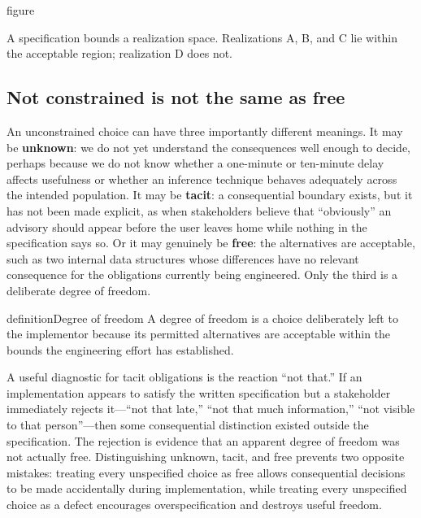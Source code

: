 \begin{bookbox}{figure}{} %
\pandocbounded{}

A specification bounds a realization space. Realizations A, B, and C lie within the acceptable
region; realization D does not.
\end{bookbox}

\subsection{Not constrained is not the same as free}\label{sec-unknown-tacit-free}

An unconstrained choice can have three importantly different meanings. It may be \textbf{unknown}: we do
not yet understand the consequences well enough to decide, perhaps because we do not know whether a
one-minute or ten-minute delay affects usefulness or whether an inference technique behaves
adequately across the intended population. It may be \textbf{tacit}: a consequential boundary exists,
but it has not been made explicit, as when stakeholders believe that ``obviously'' an advisory should
appear before the user leaves home while nothing in the specification says so. Or it may genuinely
be \textbf{free}: the alternatives are acceptable, such as two internal data structures whose
differences have no relevant consequence for the obligations currently being engineered. Only the
third is a deliberate degree of freedom.

\begin{bookbox}{definition}{Degree of freedom} %
A degree of freedom is a choice deliberately left to the implementor because its permitted
alternatives are acceptable within the bounds the engineering effort has established.
\end{bookbox}

A useful diagnostic for tacit obligations is the reaction ``not that.'' If an implementation appears
to satisfy the written specification but a stakeholder immediately rejects it---``not that late,'' ``not
that much information,'' ``not visible to that person''---then some consequential distinction existed
outside the specification. The rejection is evidence that an apparent degree of freedom was not
actually free. Distinguishing unknown, tacit, and free prevents two opposite mistakes: treating
every unspecified choice as free allows consequential decisions to be made accidentally during
implementation, while treating every unspecified choice as a defect encourages overspecification
and destroys useful freedom.

